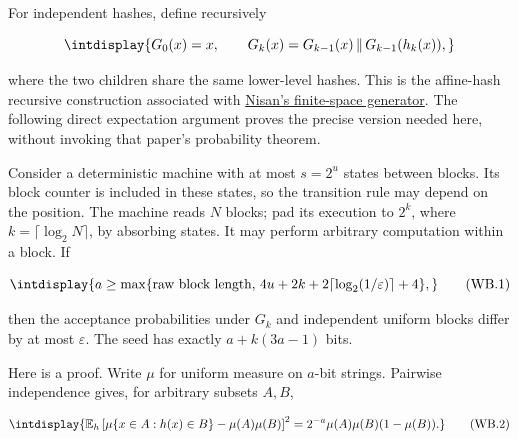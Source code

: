 
For independent hashes, define recursively


\begingroup\renewcommand{\theHequation}{intdisplay.779}
\begin{equation*}
\intdisplay{
G_0(x)=x,\qquad
G_k(x)=G_{k-1}(x)\,\Vert\,G_{k-1}(h_k(x)),
}
\end{equation*}
\endgroup


where the two children share the same lower-level hashes. This is the affine-hash recursive construction associated with \href{https://mathweb.ucsd.edu/~sbuss/CourseWeb/Math268_2013W/Nisan_PRG.pdf}{Nisan's finite-space generator}. The following direct expectation argument proves the precise version needed here, without invoking that paper's probability theorem.



Consider a deterministic machine with at most \(s=2^u\) states between blocks. Its block counter is included in these states, so the transition rule may depend on the position. The machine reads \(N\) blocks; pad its execution to \(2^k\), where \(k=\lceil\log_2 N\rceil\), by absorbing states. It may perform arbitrary computation within a block. If


\begingroup\renewcommand{\theHequation}{intdisplay.780}
\begin{equation}
\intdisplay{
a\ge\max\{\text{raw block length},\,
4u+2k+2\lceil\log_2(1/\varepsilon)\rceil+4\},
}
\tag{WB.1}
\label{int:eq-0373-wb-1}
\end{equation}
\endgroup


then the acceptance probabilities under \(G_k\) and independent uniform blocks differ by at most \(\varepsilon\). The seed has exactly \(a+k(3a-1)\) bits.



Here is a proof. Write \(\mu\) for uniform measure on \(a\)-bit strings. Pairwise independence gives, for arbitrary subsets \(A,\allowbreak B\),


\begingroup\renewcommand{\theHequation}{intdisplay.781}
\begin{equation}
\intdisplay{
\mathbb E_h\left[
\mu\{x\in A:h(x)\in B\}-\mu(A)\mu(B)
\right]^2
=2^{-a}\mu(A)\mu(B)(1-\mu(B)).
}
\tag{WB.2}
\label{int:eq-0374-wb-2}
\end{equation}
\endgroup

